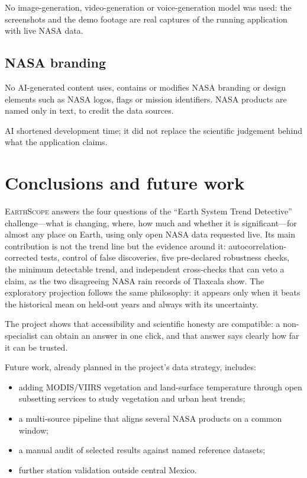 \documentclass[12pt, oneside, openany]{report}
\newcommand{\EarthScope}{\textsc{EarthScope}}
\begin{document}
No image-generation, video-generation or voice-generation model was used: the screenshots and the demo footage are real captures of the running application with live NASA data.

\section{NASA branding}

No AI-generated content uses, contains or modifies NASA branding or design elements such as NASA logos, flags or mission identifiers. NASA products are named only in text, to credit the data sources.

AI shortened development time; it did not replace the scientific judgement behind what the application claims.

\chapter{Conclusions and future work}\label{cap:conclusions}

\EarthScope{} answers the four questions of the \enquote{Earth System Trend Detective} challenge---what is changing, where, how much and whether it is significant---for almost any place on Earth, using only open NASA data requested live. Its main contribution is not the trend line but the evidence around it: autocorrelation-corrected tests, control of false discoveries, five pre-declared robustness checks, the minimum detectable trend, and independent cross-checks that can veto a claim, as the two disagreeing NASA rain records of Tlaxcala show. The exploratory projection follows the same philosophy: it appears only when it beats the historical mean on held-out years and always with its uncertainty.

The project shows that accessibility and scientific honesty are compatible: a non-specialist can obtain an answer in one click, and that answer says clearly how far it can be trusted.

Future work, already planned in the project's data strategy, includes:
\begin{itemize}[leftmargin=*]
    \item adding MODIS/VIIRS vegetation and land-surface temperature through open subsetting services to study vegetation and urban heat trends;
    \item a multi-source pipeline that aligns several NASA products on a common window;
    \item a manual audit of selected results against named reference datasets;
    \item further station validation outside central Mexico.
\end{itemize}

\printbibliography[heading=bibintoc, title={References}]
\end{document}
